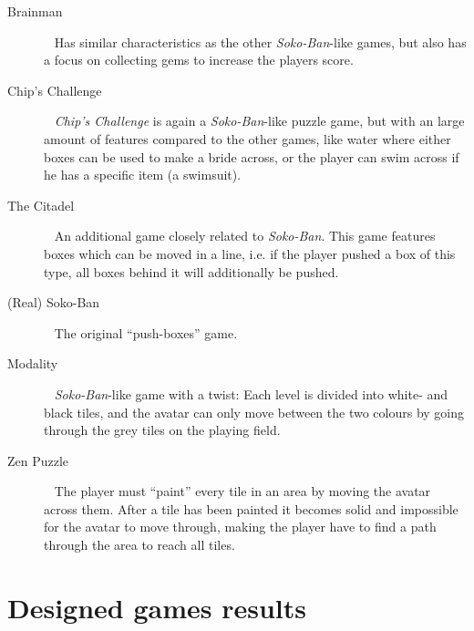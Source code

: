\documentclass[a4paper,titlepage,final]{report}
\begin{document}
\begin{appendices}
\begin{description}
\item [Brainman]~\citep{game:brainman} Has similar characteristics as the other \textit{Soko-Ban}-like games, but also has a focus on collecting gems to increase the players score.
\item [Chip's Challenge]~\citep{game:chipschallenge} \textit{Chip's Challenge} is again a \textit{Soko-Ban}-like puzzle game, but with an large amount of features compared to the other games, like water where either boxes can be used to make a bride across, or the player can swim across if he has a specific item (a swimsuit).
\item [The Citadel]~\citep{game:thecitadel} An additional game closely related to \textit{Soko-Ban}. This game features boxes which can be moved in a line, i.e. if the player pushed a box of this type, all boxes behind it will additionally be pushed.
\item [(Real) Soko-Ban]~\citep{game:sokoban} The original ``push-boxes'' game. 
\item [Modality]~\citep{game:modality} \textit{Soko-Ban}-like game with a twist: Each level is divided into white- and black tiles, and the avatar can only move between the two colours by going through the grey tiles on the playing field.
\item [Zen Puzzle]~\citep{game:zenpuzzle} The player must ``paint'' every tile in an area by moving the avatar across them. After a tile has been painted it becomes solid and impossible for the avatar to move through, making the player have to find a path through the area to reach all tiles.
\end{description}




\chapter{Designed games results}
\label{app_designedresults}


\end{appendices}
\end{document}
